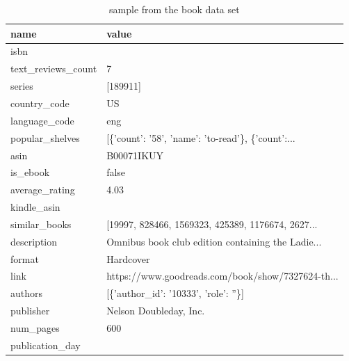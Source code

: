 \documentclass[10pt,final,journal,a4paper,oneside,twocolumn]{IEEEtran}
\begin{document}

\pagebreak

\begin{table}
    \centering
    \caption{sample from the book data set}
    \label{tab:book_sample}
    \begin{tabular}{ll}
        \toprule
        name &                                                  value \\
        \midrule
        isbn                 &                                                    \\
        text\_reviews\_count   &                                                  7 \\
        series               &                                           [189911] \\
        country\_code         &                                                 US \\
        language\_code        &                                                eng \\
        popular\_shelves      &  [\{'count': '58', 'name': 'to-read'\}, \{'count':... \\
        asin                 &                                         B00071IKUY \\
        is\_ebook             &                                              false \\
        average\_rating       &                                               4.03 \\
        kindle\_asin          &                                                    \\
        similar\_books        &  [19997, 828466, 1569323, 425389, 1176674, 2627... \\
        description          &  Omnibus book club edition containing the Ladie... \\
        format               &                                          Hardcover \\
        link                 &  https://www.goodreads.com/book/show/7327624-th... \\
        authors              &               [\{'author\_id': '10333', 'role': ''\}] \\
        publisher            &                             Nelson Doubleday, Inc. \\
        num\_pages            &                                                600 \\
        publication\_day      &                                                    \\

\end{tabular}
\end{table}
\end{document}

